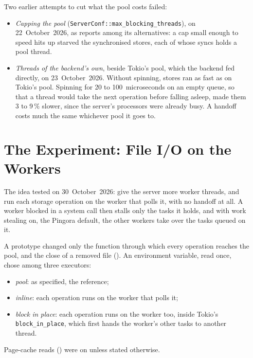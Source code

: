 Two earlier attempts to cut what the pool costs failed:
\begin{itemize}
  \item \emph{Capping the pool} (\texttt{ServerConf::max\_blocking\_threads}),
    on 22~October~2026, as  reports among
    its alternatives: a cap small enough to speed hits up starved the
    synchronised stores, each of whose syncs holds a pool thread.
  \item \emph{Threads of the backend's own}, beside Tokio's pool, which the
    backend fed directly, on 23~October~2026. Without spinning, stores ran
    as fast as on Tokio's pool. Spinning for 20 to 100~microseconds on an
    empty queue, so that a thread would take the next operation before
    falling asleep, made them 3 to 9\,\% slower, since the server's
    processors were already busy. A handoff costs much the same whichever
    pool it goes to.
\end{itemize}

\section{The Experiment: File I/O on the Workers}
\label{app:executor-experiment}

The idea tested on 30~October~2026: give the server more worker threads,
and run each storage operation on the worker that polls it, with no handoff
at all. A worker blocked in a system call then stalls only the tasks it
holds, and with work stealing on, the Pingora default, the other workers
take over the tasks queued on it.

A prototype changed only the function through which every operation
reaches the pool, and the close of a removed file
(). An environment variable, read once,
chose among three executors:
\begin{itemize}
  \item \emph{pool}:  as specified, the
    reference;
  \item \emph{inline}: each operation runs on the worker that polls it;
  \item \emph{block in place}: each operation runs on the worker too,
    inside Tokio's \texttt{block\_in\_place}, which first hands the
    worker's other tasks to another thread.
\end{itemize}
Page-cache reads () were on unless stated
otherwise.

